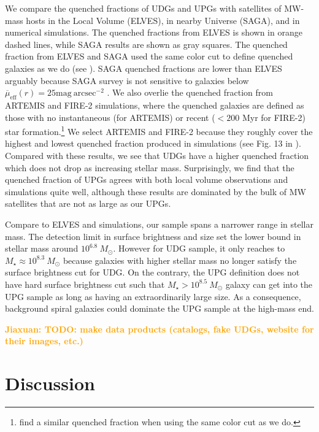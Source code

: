 \documentclass[twocolumn,astrosymb,twocolappendix]{aastex631}
\newcommand{\sbunit}{\mathrm{mag\ arcsec}^{-2}}
\newcommand{\sbeffr}{\overline{\mu}_{\mathrm{eff}}(r)}
\newcommand{\jiaxuan}[1]{\textcolor{orange}{\textbf{Jiaxuan: #1}}}
\begin{document}
\begin{CJK*}{UTF8}{gbsn}
We compare the quenched fractions of UDGs and UPGs with satellites of MW-mass hosts in the Local Volume (ELVES), in nearby Universe (SAGA), and in numerical simulations. The quenched fractions from ELVES is shown in orange dashed lines, while SAGA results are shown as gray squares. The quenched fraction from ELVES and SAGA used the same color cut to define quenched galaxies as we do (see \citealt{CarlstenELVES2022}). SAGA quenched fractions are lower than ELVES arguably because SAGA survey is not sensitive to galaxies below $\sbeffr = 25\sbunit$ \citep{Font2022}. We also overlie the quenched fraction from ARTEMIS \citep[purple lines,][]{Font2022} and FIRE-2 \citep[pink dotted lines][]{Samuel2022} simulations, where the quenched galaxies are defined as those with no instantaneous (for ARTEMIS) or recent ($<200$ Myr for FIRE-2) star formation.\footnote{\citet{Font2022} find a similar quenched fraction when using the same color cut as we do.} We select ARTEMIS and FIRE-2 because they roughly cover the highest and lowest quenched fraction produced in simulations (see Fig. 13 in \citep{Samuel2022}). Compared with these results, we see that UDGs have a higher quenched fraction which does not drop as increasing stellar mass. Surprisingly, we find that the quenched fraction of UPGs agrees with both local volume observations and simulations quite well, although these results are dominated by the bulk of MW satellites that are not as large as our UPGs. 

Compare to ELVES and simulations, our sample spans a narrower range in stellar mass. The detection limit in surface brightness and size set the lower bound in stellar mass around $10^{6.8}\ M_\odot$. However for UDG sample, it only reaches to $M_\star\approx 10^{8.3}\ M_\odot$ because galaxies with higher stellar mass no longer satisfy the surface brightness cut for UDG. On the contrary, the UPG definition does not have hard surface brightness cut such that $M_\star > 10^{8.5}\ M_\odot$ galaxy can get into the UPG sample as long as having an extraordinarily large size. As a consequence, background spiral galaxies could dominate the UPG sample at the high-mass end.


\jiaxuan{TODO: make data products (catalogs, fake UDGs, website for their images, etc.)}

\section{Discussion}\label{sec:discussion}


\end{CJK*}
\end{document}
